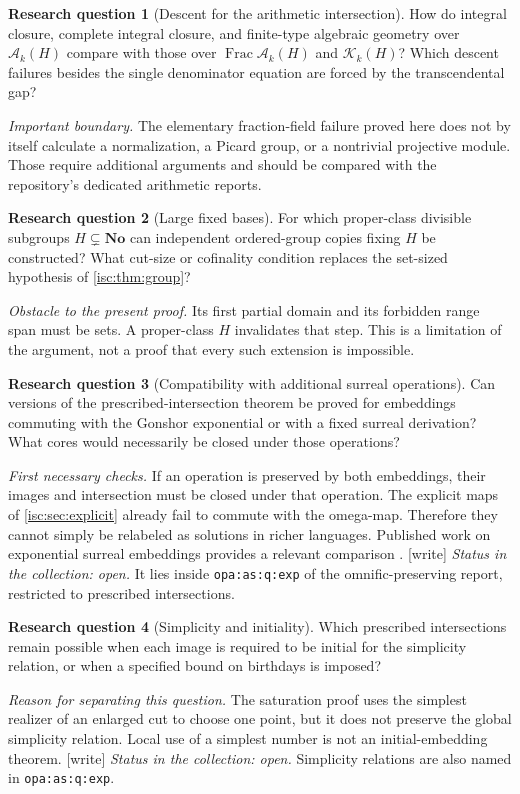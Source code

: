 \documentclass[11pt,letterpaper]{article}
\theoremstyle{definition}
\newtheorem{question}{Research question}
\theoremstyle{remark}
\newcommand{\No}{\mathbf{No}}
\newcommand{\K}[2]{\mathcal K_{#1}(#2)}
\newcommand{\A}[2]{\mathcal A_{#1}(#2)}
\newcommand{\Frac}{\operatorname{Frac}}
\newcommand{\lbl}[1]{\nolinkurl{#1}}%
\newcommand{\wtag}{\textup{[write]}}%
\numberwithin{equation}{section}
\begin{document}
\begin{question}[Descent for the arithmetic intersection]
How do integral closure, complete integral closure, and finite-type
algebraic geometry over $\A{k}{H}$ compare with those over
$\Frac\A{k}{H}$ and $\K{k}{H}$? Which descent failures besides the
single denominator equation are forced by the transcendental gap?
\end{question}
\noindent\emph{Important boundary.} The elementary fraction-field failure
proved here does not by itself calculate a normalization, a Picard group,
or a nontrivial projective module. Those require additional arguments and
should be compared with the repository's dedicated arithmetic reports.

\begin{question}[Large fixed bases]
For which proper-class divisible subgroups $H\subsetneq\No$ can independent
ordered-group copies fixing $H$ be constructed? What cut-size or cofinality
condition replaces the set-sized hypothesis of \cref{isc:thm:group}?
\end{question}
\noindent\emph{Obstacle to the present proof.} Its first partial domain and
its forbidden range span must be sets. A proper-class $H$ invalidates that
step. This is a limitation of the argument, not a proof that every such
extension is impossible.

\begin{question}[Compatibility with additional surreal operations]
Can versions of the prescribed-intersection theorem be proved for embeddings
commuting with the Gonshor exponential or with a fixed surreal derivation?
What cores would necessarily be closed under those operations?
\end{question}
\noindent\emph{First necessary checks.} If an operation is preserved by both
embeddings, their images and intersection must be closed under that operation.
The explicit maps of \cref{isc:sec:explicit} already fail to commute with the
omega-map. Therefore they cannot simply be relabeled as solutions in richer
languages. Published work on exponential surreal embeddings provides a
relevant comparison \cite{EK}.
\wtag{} \emph{Status in the collection: open.} It lies inside
\lbl{opa:as:q:exp} of the omnific-preserving report, restricted to
prescribed intersections.

\begin{question}[Simplicity and initiality]
Which prescribed intersections remain possible when each image is required
to be initial for the simplicity relation, or when a specified bound on
birthdays is imposed?
\end{question}
\noindent\emph{Reason for separating this question.} The saturation proof
uses the simplest realizer of an enlarged cut to choose one point, but it
does not preserve the global simplicity relation. Local use of a simplest
number is not an initial-embedding theorem.
\wtag{} \emph{Status in the collection: open.} Simplicity relations are
also named in \lbl{opa:as:q:exp}.
\end{document}
